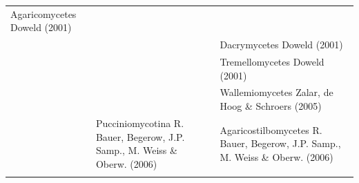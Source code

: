 \documentclass[]{book}
\begin{document}
\begin{longtable}[]{@{}lll@{}}
\begin{minipage}[t]{0.31\columnwidth}
Agaricomycetes Doweld (2001)\strut
\end{minipage}\tabularnewline
\begin{minipage}[t]{0.32\columnwidth}\raggedright
\strut
\end{minipage} & \begin{minipage}[t]{0.28\columnwidth}\raggedright
\strut
\end{minipage} & \begin{minipage}[t]{0.31\columnwidth}\raggedright
Dacrymycetes Doweld (2001)\strut
\end{minipage}\tabularnewline
\begin{minipage}[t]{0.32\columnwidth}\raggedright
\strut
\end{minipage} & \begin{minipage}[t]{0.28\columnwidth}\raggedright
\strut
\end{minipage} & \begin{minipage}[t]{0.31\columnwidth}\raggedright
Tremellomycetes Doweld (2001)\strut
\end{minipage}\tabularnewline
\begin{minipage}[t]{0.32\columnwidth}\raggedright
\strut
\end{minipage} & \begin{minipage}[t]{0.28\columnwidth}\raggedright
\strut
\end{minipage} & \begin{minipage}[t]{0.31\columnwidth}\raggedright
Wallemiomycetes Zalar, de Hoog \& Schroers (2005)\strut
\end{minipage}\tabularnewline
\begin{minipage}[t]{0.32\columnwidth}\raggedright
\strut
\end{minipage} & \begin{minipage}[t]{0.28\columnwidth}\raggedright
Pucciniomycotina R. Bauer, Begerow, J.P. Samp., M. Weiss \& Oberw. (2006)\strut
\end{minipage} & \begin{minipage}[t]{0.31\columnwidth}\raggedright
Agaricostilbomycetes R. Bauer, Begerow, J.P. Samp., M. Weiss \& Oberw. (2006)\strut
\end{minipage}\tabularnewline
\begin{minipage}[t]{0.32\columnwidth}\raggedright
\strut
\end{minipage} & \begin{minipage}[t]{0.28\columnwidth}\raggedright
\strut
\end{minipage} & \begin{minipage}[t]{0.31\columnwidth}\raggedright

\end{minipage}
\end{longtable}
\end{document}
